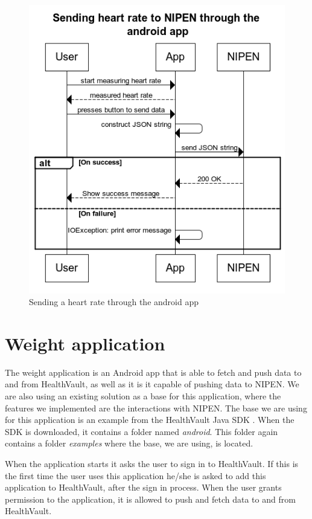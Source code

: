 \begin{figure}[h]
\centering
\includegraphics[scale=1.0]{../Figures/sending-heart-rate-through-app.png}
\caption{Sending a heart rate through the android app}
\label{figure:sending-heart-rate-through-app}
\end{figure}

\section{Weight application}

The weight application is an Android app that is able to fetch and push data to and from HealthVault, as well as it is it capable of pushing data to NIPEN.
We are also using an existing solution as a base for this application, where the features we implemented are the interactions with NIPEN.
The base we are using for this application is an example from the HealthVault Java SDK \cite{HealthVaultSDK}.
When the SDK is downloaded, it contains a folder named \textit{android}. 
This folder again contains a folder \textit{examples} where the base, we are using, is located.

When the application starts it asks the user to sign in to HealthVault.
If this is the first time the user uses this application he/she is asked to add this application to HealthVault, after the sign in process.
When the user grants permission to the application, it is allowed to push and fetch data to and from HealthVault.

